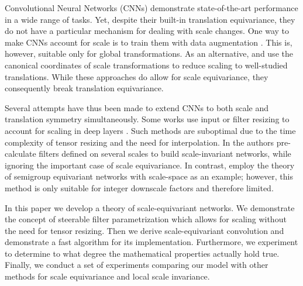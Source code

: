 \documentclass{article} \usepackage{multirow}
\begin{document}
Convolutional Neural Networks (CNNs) demonstrate state-of-the-art performance in a wide range of tasks. Yet, despite their built-in translation equivariance, they do not have a particular mechanism for dealing with scale changes. One way to make CNNs account for scale is to train them with data augmentation \citet{barnard1991invariance}. This is, however, suitable only for global transformations. As an alternative, \citet{henriques2017warped} and \citet{tai2019equivariant} use the canonical coordinates of scale transformations to reduce scaling to well-studied translations. While these approaches do allow for scale equivariance, they consequently break translation equivariance. 

Several attempts have thus been made to extend CNNs to both scale and translation symmetry simultaneously. Some works use input or filter resizing to account for scaling in deep layers \citet{xu2014scale, kanazawa2014locally}. Such methods are suboptimal due to the time complexity of tensor resizing and the need for interpolation. In \citet{ghosh2019scale} the authors pre-calculate filters defined on several scales to build scale-invariant networks, while ignoring the important case of scale equivariance. In contrast, \citet{worrall2019deep} employ the theory of semigroup equivariant networks with scale-space as an example; however, this method is only suitable for integer downscale factors and therefore limited.

In this paper we develop a theory of scale-equivariant networks. 
We demonstrate the concept of steerable filter parametrization which allows for 
scaling without the need for tensor resizing. Then we derive scale-equivariant convolution
and demonstrate a fast algorithm for its implementation.
Furthermore, we experiment to determine to what degree the mathematical properties actually hold true. 
Finally, we conduct a set of experiments comparing our model with 
other methods for scale equivariance and local scale invariance.
\end{document}
